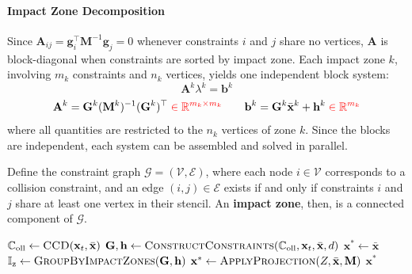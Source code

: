 \documentclass{article}
\newcommand{\red}[1]{\textcolor{red}{#1}}
\newcommand{\graycomment}[1]{\Comment{\textcolor{gray}{#1}}}
\begin{document}
\paragraph{Impact Zone Decomposition} Since $\mathbf{A}_{ij} = \mathbf{g}_i^\top \mathbf{M}^{-1} \mathbf{g}_j = 0$ whenever constraints $i$ and $j$ share no vertices, $\mathbf{A}$ is block-diagonal when constraints are sorted by impact zone. Each impact zone $k$, involving $m_k$ constraints and $n_k$ vertices, yields one independent block system:
\begin{equation*}
    \mathbf{A}^{k}\lambda^{k} = \mathbf{b}^{k}
\end{equation*}
\begin{equation*}
    \mathbf{A}^{k} = \mathbf{G}^{k}(\mathbf{M}^{k})^{-1}(\mathbf{G}^{k})^\top \;\red{\in \mathbb{R}^{m_k \times m_k}}
    \qquad
    \mathbf{b}^{k} = \mathbf{G}^{k}\bar{\mathbf{x}}^{k} + \mathbf{h}^{k} \;\red{\in \mathbb{R}^{m_k}}
\end{equation*}
where all quantities are restricted to the $n_k$ vertices of zone $k$. Since the blocks are independent, each system can be assembled and solved in parallel. 

\begin{definitionbox}[frametitle={Impact Zone}]
Define the constraint graph $\mathcal{G} = (\mathcal{V}, \mathcal{E})$, where each node $i \in \mathcal{V}$ corresponds to a collision constraint, and an edge $(i,j) \in \mathcal{E}$ exists if and only if constraints $i$ and $j$ share at least one vertex in their stencil. An \textbf{impact zone}, then, is a connected component of $\mathcal{G}$.
\end{definitionbox}

\begin{algorithm}[H]
\caption{Non-Rigid Impact Zone collision response (single-iteration approximation).}
\label{alg:nonrigid_impact_zone}
\begin{algorithmic}[1]
\addtolength{\itemsep}{0.5ex}
    \State $\mathbb{C}_{\text{oll}} \gets \textsc{CCD}(\mathbf{x}_t, \bar{\mathbf{x}})$
    \State $\mathbf{G}, \mathbf{h} \gets \textsc{ConstructConstraints}(\mathbb{C}_{\text{oll}}, \mathbf{x}_t, \bar{\mathbf{x}}, d)$
    \State $\mathbf{x}^* \gets \bar{\mathbf{x}}$
    \State $\mathbb{I}_\text{z} \gets \textsc{GroupByImpactZones}(\mathbf{G}, \mathbf{h})$
        \State $\mathbf{x}^* \gets \textsc{ApplyProjection}(Z, \bar{\mathbf{x}}, \mathbf{M})$ \graycomment{Eqs.~\ref{eq:nonrigid_impact_linear_system},~\ref{eq:nonrigid_impact_position_solution}}
    \EndFor
    \State \Return $\mathbf{x}^*$
\EndFunction
\end{algorithmic}
\end{algorithm}
\end{document}

